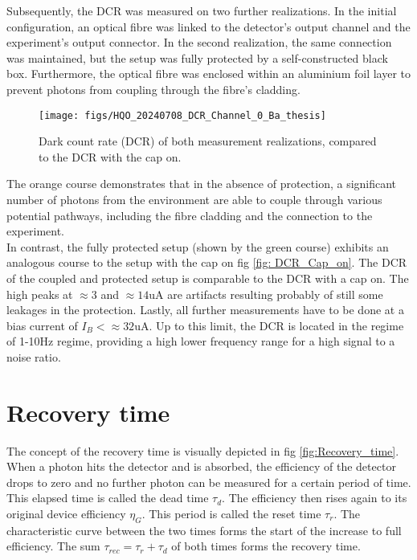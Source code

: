 Subsequently, the DCR was measured on two further realizations.
In the initial configuration, an optical fibre was linked to the detector's output channel and the experiment's output connector.
In the second realization, the same connection was maintained, but the setup was fully protected by a self-constructed black box.
Furthermore, the optical fibre was enclosed within an aluminium foil layer to prevent photons from coupling through the fibre's cladding.

\begin{figure}[H]
 \centering
 \texttt{[image: figs/HQO\_20240708\_DCR\_Channel\_0\_Ba\_thesis]}
 \caption{Dark count rate (DCR) of both measurement realizations, compared to the DCR with the cap on.}
 \label{fig: DCR_black_box_to_exp}
\end{figure}

The orange course demonstrates that in the absence of protection, a significant number of photons from the environment
are able to couple through various potential pathways, including the fibre cladding and the connection to the experiment.\\
In contrast, the fully protected setup (shown by the green course) exhibits an analogous course to the setup with the cap
on fig \ref{fig: DCR_Cap_on}.
The DCR of the coupled and protected setup is comparable to the DCR with a cap on.
The high peaks at $\approx 3$ and $\approx 14$uA are artifacts resulting probably of still some leakages in the protection.
Lastly, all further measurements have to be done at a bias current of $ I_B < \approx 32$uA.
Up to this limit, the DCR is located in the regime of 1-10Hz regime, providing a high lower frequency range for a high
signal to a noise ratio.

\section{Recovery time}\label{sec:recovery-time}

The concept of the recovery time is visually depicted in fig \ref{fig:Recovery_time}.
When a photon hits the detector and is absorbed, the efficiency of the detector drops to zero and no further photon can
be measured for a certain period of time.
This elapsed time is called the dead time $\tau_{d}$.
The efficiency then rises again to its original device efficiency $\eta_{G}$.
This period is called the reset time $\tau_{r}$.
The characteristic curve between the two times forms the start of the increase to full efficiency.
The sum $\tau_{rec} = \tau_{r} + \tau_{d}$ of both times forms the recovery time.

